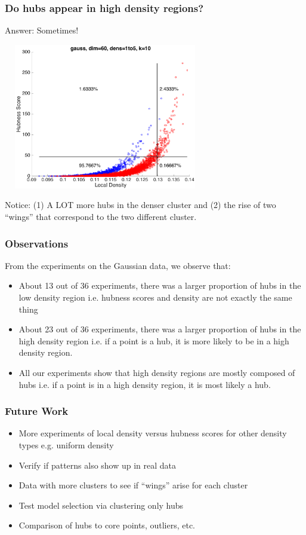 \documentclass{beamer}
\begin{document}
\begin{frame}
\frametitle{Do hubs appear in high density regions?}

{\small Answer: Sometimes!}

\smallskip

\centering
\includegraphics[width=3.5in,height=2.5in]{./fig/gauss-dim60-1000to5000-k10-DensHub.png}

\smallskip

{\small Notice: (1) A LOT more hubs in the denser cluster and (2) the rise of two ``wings'' that correspond to the two different cluster.}
\end{frame}

\begin{frame}
\frametitle{Observations}

From the experiments on the Gaussian data, we observe that:

\begin{itemize}
\item About 13 out of 36 experiments, there was a larger proportion of hubs in the low density region i.e. hubness scores and density are not exactly the same thing
\item About 23 out of 36 experiments, there was a larger proportion of hubs in the high density region i.e. if a point is a hub, it is more likely to be in a high density region.
\item All our experiments show that high density regions are mostly composed of hubs i.e. if a point is in a high density region, it is most likely a hub.
\end{itemize}

\end{frame}

\begin{frame}
\frametitle{Future Work}

\begin{itemize}
\item More experiments of local density versus hubness scores for other density types e.g. uniform density
\item Verify if patterns also show up in real data
\item Data with more clusters to see if ``wings'' arise for each cluster
\item Test model selection via clustering only hubs
\item Comparison of hubs to core points, outliers, etc. 
\end{itemize}

\end{frame}

\end{document}
